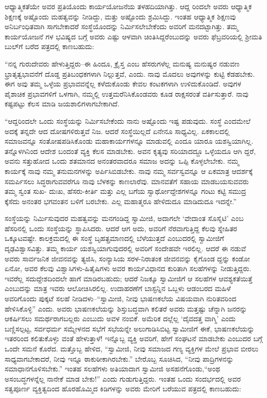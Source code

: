 ಆಧ್ಯಾತ್ಮಿಕತೆಯೇ ಅವರ ಪ್ರತಿಯೊಂದು ಕಾರ್ಯಯೋಜನೆಯ ತಳಹದಿಯಾಗಿತ್ತು. ಆದ್ದ ರಿಂದಲೇ ಅವರು ಆಧ್ಯಾತ್ಮಿಕ ಶಿಕ್ಷಣಕ್ಕೆ ಅಷ್ಟೊಂದು ಮಹತ್ವವನ್ನು ನೀಡಿದ್ದು, ಮತ್ತು ಅಷ್ಟೊಂದು ಶ್ರಮಿಸಿದ್ದು. ಇಂತಹ ಆಧ್ಯಾತ್ಮಿಕ ಶಿಕ್ಷಣವು ಅನಿರ್ಬಂಧಿತವಾಗಿ ಸಾಗಬೇಕಾದರೆ ಸಂಸ್ಥೆಯೊಂದನ್ನು ನಿರ್ಮಿಸಲೇಬೇಕೆಂದು ಅವರಿಗೆ ಮನದಟ್ಟಾಗಿತ್ತು. ತಮ್ಮ ಕಾರ್ಯಯೋಜನೆ ಗಳ ಭವಿಷ್ಯದ ಬಗ್ಗೆ ಅವರು ಎಷ್ಟು ಆಳವಾಗಿ ಚಿಂತಿಸಿದ್ದರೆಂಬುದನ್ನು ಅವರು ಫೆಬ್ರವರಿಯಲ್ಲಿ ಶ್ರೀಮತಿ ಬುಲ್​ಗೆ ಬರೆದ ಪತ್ರದಲ್ಲಿ ಕಾಣಬಹುದು:

“ನನ್ನ ಗುರುದೇವರು ಹೇಳುತ್ತಿದ್ದರು–ಈ ಹಿಂದೂ, ಕ್ರೈಸ್ತ ಎಂಬ ಹೆಸರುಗಳೆಲ್ಲ ಮನುಷ್ಯ ಮನುಷ್ಯರ ನಡುವಣ ಭ್ರಾತೃತ್ವಭಾವನೆಗೆ ದೊಡ್ಡ ಪ್ರತಿಬಂಧಕಗಳಾಗಿ ನಿಲ್ಲುತ್ತವೆ, ಎಂದು. ನಾವು ಮೊದಲು ಅವುಗಳನ್ನು ಕುಟ್ಟಿ ಕೆಡಹಬೇಕು. ಈಗ ಅವು ತಮ್ಮ ಒಳ್ಳೆಯ ಪ್ರಭಾವವನ್ನೆಲ್ಲ ಕಳೆದುಕೊಂಡು ಕೇವಲ ಕಂಟಕಗಳಾಗಿ ಉಳಿದುಕೊಂಡಿದೆ. ಅವುಗಳ ಪೈಶಾಚಿಕ ಪ್ರಭಾವಗಳಿಗೆ ಒಳಗಾಗಿ, ನಮ್ಮಲ್ಲಿ ಉತ್ತಮರೆನಿಸಿಕೊಂಡವರು ಕೂಡ ರಾಕ್ಷಸರಂತೆ ವರ್ತಿಸುತ್ತಾರೆ. ನಾವು ಕಷ್ಟಪಟ್ಟು ಕೆಲಸ ಮಾಡಿ ಜಯಶಾಲಿಗಳಾಗಬೇಕಾಗಿದೆ.

“ಆದ್ದರಿಂದಲೇ ಒಂದು ಸಂಸ್ಥೆಯನ್ನು ನಿರ್ಮಿಸಬೇಕೆಂದು ನಾನು ಅಷ್ಟೊಂದು ಇಷ್ಟ ಪಡುವುದು. ಸಂಸ್ಥೆ ಎಂದಮೇಲೆ ಅದಕ್ಕೆ ತನ್ನದೇ ಆದ ದೋಷಗಳಿರುತ್ತವೆ ನಿಜ. ಆದರೆ ಸಂಸ್ಥೆಯಿಲ್ಲದೆ ಏನೇನೂ ಸಾಧ್ಯವಿಲ್ಲ. ಏಕಕಾಲದಲ್ಲಿ ಸಮಾಜವನ್ನೂ ಸಂತೋಷಪಡಿಸಿಕೊಂಡು ಮಹಾಕಾರ್ಯಗಳನ್ನೂ ಮಾಡುವಲ್ಲಿ ಎಂದೂ ಯಾರೂ ಯಶಸ್ವಿಯಾಗಿಲ್ಲ. ತನ್ನೊಳಗಿನಿಂದ ಆದೇಶ ಬಂದಂತೆ ವ್ಯಕ್ತಿ ಕೆಲಸ ಮಾಡಬೇಕು. ಅವನ ಕೃತ್ಯವು ಸರಿಯಾದದ್ದೂ ಒಳ್ಳೆಯದೂ ಆಗಿ ದ್ದರೆ, ಅವನು ಸತ್ತುಹೋದ ಒಂದು ಶತಮಾನದ ಅನಂತರವಾದರೂ ಸಮಾಜ ಅದನ್ನು ಒಪ್ಪಿ ಕೊಳ್ಳಲೇಬೇಕು. ನಮ್ಮ ಕಾರ್ಯಕ್ಕೆ ನಾವು ನಮ್ಮ ತನುಮನಗಳನ್ನು ಅರ್ಪಿಸಿಬಿಡಬೇಕು. ನಾವು ನಮ್ಮ ಸರ್ವಸ್ವವನ್ನೂ ಆ ಏಕಮಾತ್ರ ಆದರ್ಶಕ್ಕೆ ಸಮರ್ಪಿಸಲು ಸಿದ್ಧರಾಗುವವರೆಗೂ ನಾವು ಬೆಳಕನ್ನು ಕಾಣಲಾರೆವು. ಮಾನವತೆಗೆ ಸಹಾಯ ಮಾಡಬಯಸುವವರು ತಮ್ಮ ಸ್ವಂತ ಸುಖ- ದುಃಖ, ಹೆಸರು-ಕೀರ್ತಿ ಮತ್ತು ಎಲ್ಲ ಬಗೆಯ ಸ್ವಾರ್ಥೋದ್ದೇಶಗಳನ್ನೂ ಗಂಟು ಕಟ್ಟಿ ಸಮುದ್ರ ಕ್ಕೆಸೆದು ಅನಂತರ ಭಗವಂತನ ಬಳಿಗೆ ಬರಬೇಕು. ಎಲ್ಲ ಮಹಾತ್ಮರೂ ಹೇಳಿದುದೂ ಮಾಡಿದುದೂ ಇದನ್ನೇ.”

ಸಂಸ್ಥೆಯನ್ನು ನಿರ್ಮಿಸುವುದರ ಮಹತ್ವವನ್ನು ಮನಗಂಡಿದ್ದ ಸ್ವಾಮೀಜಿ, ಅದಾಗಲೇ ‘ವೇದಾಂತ ಸೊಸೈಟಿ’ ಎಂಬ ಹೆಸರಿನಲ್ಲಿ ಒಂದು ಸಂಸ್ಥೆಯನ್ನು ಸ್ಥಾಪಿಸಿದರು. ಆದರೆ ಆಗ ಅದು, ಅವರಿಗೆ ನೆರವಾಗುತ್ತಿದ್ದ ಕೆಲವು ಸ್ನೇಹಿತರ ಒಕ್ಕೂಟವಷ್ಟೇ. ಕಾಲಕ್ರಮದಲ್ಲಿ ಈ ಸಂಸ್ಥೆ ಬೃಹತ್ಪ್ರಮಾಣದಲ್ಲಿ ಬೆಳೆಯುತ್ತದೆ ಎಂಬುದರಲ್ಲಿ ಸ್ವಾಮೀಜಿಗೆ ದೃಢವಿಶ್ವಾಸವಿತ್ತು. ತಮ್ಮ ಕಾರ್ಯ ಯಶಸ್ವಿಯಾಗುವುದರಲ್ಲಿ ಅವರಿಗೆ ಸಂದೇಹವೇ ಇರಲಿಲ್ಲ. ಆದರೆ ಈ ನಡುವೆ ಅವರು ಸಾರ್ವಜನಿಕ ಜೀವನವನ್ನು ತ್ಯಜಿಸಿ, ಸಂನ್ಯಾಸಿಯ ಸರಳ-ನಿರಾತಂಕ ಜೀವನವನ್ನು ಕೈಗೊಂಡ ದ್ದನ್ನು ಕಂಡೋ ಏನೋ, ಅವರ ಕೆಲವು ವಿಶ್ವಾಸಿಗಳು-ಹಿತೈಷಿಗಳು ಅವರ ಕಾರ್ಯವಿಧಾನದ ಕುರಿತಾಗಿ ಸಲಹೆಗಳನ್ನು ನೀಡುತ್ತಿದ್ದರು. ಇವರೆಲ್ಲ ಸದುದ್ದೇಶದಿಂದಲೇ ಹಾಗೆ ಮಾಡಿರಬಹುದು; ಆದರೆ ನಿಜಕ್ಕೂ ಸ್ವಾಮೀಜಿಗೆ ಆ ಸಲಹೆಗಳ ಆವಶ್ಯಕತೆಯಿತ್ತೆ ಎಂಬುದನ್ನು ಮಾತ್ರ ಇವರು ಆಲೋಚಿಸಿರಲಿಲ್ಲ. ಉದಾಹರಣೆಗೆ ಬಾಸ್ಟನ್ನಿನ ಒಬ್ಬಳು ಆಡಂಬರದ ಮಹಿಳೆ ಅವರಿಗೊಂದು ಪುಕ್ಕಟೆ ಸಲಹೆ ನೀಡಿದಳು–“ಸ್ವಾಮೀಜಿ, ನೀವು ಭಾಷಣಕಲೆಯ ವಿಷಯವಾಗಿ ನುರಿತವರಿಂದ ಹೇಳಿಸಿಕೊಳ್ಳಿ” ಎಂದು. ಅವರು ಭಾಷಣಕಲೆಯನ್ನು ಶಿಸ್ತುಬದ್ಧವಾಗಿ ಕಲಿತರೆ ಅವರು ಮತ್ತಷ್ಟು ಚೆನ್ನಾಗಿ ಜನರನ್ನು ಆಕರ್ಷಿಸಲು ಸಮರ್ಥರಾಗಬಲ್ಲರು ಎಂಬುದು ಅವಳ ನಂಬಿಕೆ. ಅಮೆರಿಕ ದಲ್ಲೆಲ್ಲ ‘ದೈವದತ್ತ ವಾಗ್ಮಿ’ ಎಂದು ಬಣ್ಣಿಸಲ್ಪಟ್ಟ, ಸರ್ವಧರ್ಮ ಸಮ್ಮೇಳನದ ಸಭೆಗೆ ಸಭೆಯನ್ನೇ ಅಲುಗಾಡಿಸಿಬಿಟ್ಟ ಸ್ವಾಮೀಜಿಗೆ ಈಕೆ, ಭಾಷಣಕಲೆಯನ್ನು ಇತರರಿಂದ ಕಲಿತುಕೊಳ್ಳು ವಂತೆ ಹೇಳುತ್ತಾಳೆ! ಇನ್ನೊಬ್ಬ ವ್ಯಕ್ತಿ ಅವರಿಗೆ, ಹೇಗೆ ಸಂಘಟನೆ ಮಾಡಬೇಕು ಎಂಬುದರ ಬಗ್ಗೆ ಒಂದೇ ಸಮನೆ ಕೊರೆದ. ಮತ್ತೊಬ್ಬ ಹೇಳಿದ, “ಸ್ವಾಮೀಜಿ, ನೀವು ಸಮಾಜದ ಗಣ್ಯ ವ್ಯಕ್ತಿಗಳ ಮೇಲೆ ಪ್ರಭಾವ ಬೀರಲು ಸಾಧ್ಯವಾಗಬೇಕಾದರೆ, ನೀವು ಇನ್ನೂ ಠಾಕುಠೀಕಾಗಿರಬೇಕು.” ಬೇರೊಬ್ಬ ಸೂಚಿಸಿದ, “ನೀವು ಪಾದ್ರಿಗಳನನ್ನು ಸಮಾಧಾನಗೊಳಿಸಬೇಕು.” ಇಂತಹ ಸಲಹೆಗಳು ಅತಿಯಾದಾಗ ಸ್ವಾಮೀಜಿ ಅಸಹನೆಗೊಂಡು,“ಅಂಥ ಅಸಂಬದ್ಧಗಳನ್ನೆಲ್ಲ ನಾನೇಕೆ ಮಾಡ ಬೇಕು!” ಎಂದು ಗುಡುಗುತ್ತಿದ್ದರು. ಇಂತಹ ಒಂದು ಸಂದರ್ಭದಲ್ಲಿ ಅವರ ಸತ್ವಪೂರ್ಣ ವ್ಯಕ್ತಿತ್ವದಿಂದ ಹೊರಹೊಮ್ಮಿದ ಕಿಡಿಗಳನ್ನು ಅವರು ಮೇರಿಗೆ ಬರೆಯುವ ಪತ್ರದಲ್ಲಿ ಕಾಣಬಹುದು:

